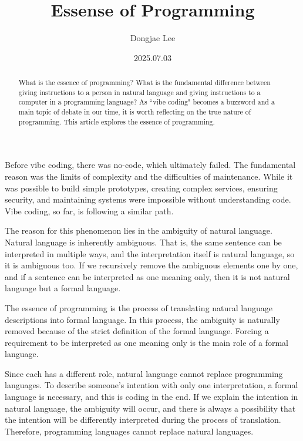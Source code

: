 \documentclass[11pt, oneside]{article}
\title{Essense of Programming}
\author{Dongjae Lee}
\date{2025.07.03}
\begin{document}
\maketitle

\begin{abstract}
	What is the essence of programming? What is the fundamental difference between giving instructions to a person in natural language and giving instructions to a computer in a programming language?
	As ``vibe coding" becomes a buzzword and a main topic of debate in our time, it is worth reflecting on the true nature of programming.
	This article explores the essence of programming.
\end{abstract}

Before vibe coding, there was no-code, which ultimately failed.
The fundamental reason was the limits of complexity and the difficulties of maintenance.
While it was possible to build simple prototypes, creating complex services, ensuring security, and maintaining systems were impossible without understanding code.
Vibe coding, so far, is following a similar path.

The reason for this phenomenon lies in the ambiguity of natural language.
Natural language is inherently ambiguous.
That is, the same sentence can be interpreted in multiple ways, and the interpretation itself is natural language, so it is ambiguous too.
If we recursively remove the ambiguous elements one by one, and if a sentence can be interpreted as one meaning only, then it is not natural language but a formal language.

The essence of programming is the process of translating natural language descriptions into formal language.
In this process, the ambiguity is naturally removed because of the strict definition of the formal language.
Forcing a requirement to be interpreted as one meaning only is the main role of a formal language.

Since each has a different role, natural language cannot replace programming languages.
To describe someone's intention with only one interpretation, a formal language is necessary, and this is coding in the end.
If we explain the intention in natural language, the ambiguity will occur, and there is always a possibility that the intention will be differently interpreted during the process of translation.
Therefore, programming languages cannot replace natural languages.
\end{document}
